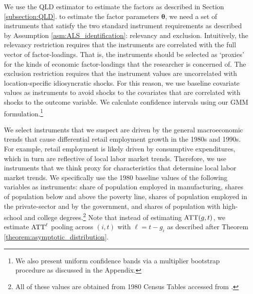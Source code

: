 \documentclass[12pt]{article}
\begin{document}
We use the QLD estimator to estimate the factors as described in Section \ref{subsection:QLD}. to estimate the factor parameters $\bm \theta$, we need a set of instruments that satisfy the two standard instrument requirements as described by Assumption \ref{asm:ALS_identification}: relevancy and exclusion. Intuitively, the relevancy restriction requires that the instruments are correlated with the full vector of factor-loadings. That is, the instruments should be selected as `proxies' for the kinds of economic factor-loadings that the researcher is concerned of. The exclusion restriction requires that the instrument values are uncorrelated with location-specific idiosyncratic shocks. For this reason, we use baseline covariate values as instruments to avoid shocks to the covariates that are correlated with shocks to the outcome variable. We calculate confidence intervals using our GMM formulation.\footnote{We also present uniform confidence bands via a multiplier bootstrap procedure as discussed in the Appendix.}

We select instruments that we suspect are driven by the general macroeconomic trends that cause differential retail employment growth in the 1980s and 1990s. For example, retail employment is likely driven by consumptive expenditures, which in turn are reflective of local labor market trends. Therefore, we use instruments that we think proxy for characteristics that determine local labor market trends. We specifically use the 1980 baseline values of the following variables as instruments: share of population employed in manufacturing, shares of population below and above the poverty line, shares of population employed in the private-sector and by the government, and shares of population with high-school and college degrees.\footnote{All of these values are obtained from 1980 Census Tables accessed from \citet{manson2020ipums}.} Note that instead of estimating $\text{ATT}(g,t)$, we estimate $\text{ATT}^\ell$ pooling across $(i, t)$ with $\ell = t - g_i$ as described after Theorem \ref{theorem:asymptotic_distribution}.
\end{document}
